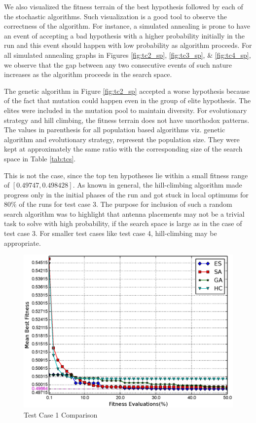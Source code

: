 \documentclass[conference]{IEEEtran}
\begin{document}
We also visualized the fitness terrain of the best hypothesis followed by each of the stochastic algorithms. Such visualization is a good tool to observe the correctness of the algorithm. For instance, a simulated annealing is prone to have an event of accepting a bad hypothesis with a higher probability initially in the run and this event should happen with low probability as algorithm proceeds. For all simulated annealing graphs in Figures \ref{fig:tc2_sp}, \ref{fig:tc3_sp}, \& \ref{fig:tc4_sp}, we observe that the gap between any two consecutive events of such nature increases as the algorithm proceeds in the search space. 

The genetic algorithm in Figure \ref{fig:tc2_sp} accepted a worse hypothesis because of the fact that mutation could happen even in the group of elite hypothesis. The elites were included in the mutation pool to maintain diversity. For evolutionary strategy and hill climbing, the fitness terrain does not have unorthodox patterns. The values in parenthesis for all population based algorithms viz. genetic algorithm and evolutionary strategy, represent the population size. They were kept at approximately the same ratio with the corresponding size of the search space in Table \ref{tab:tcs}.

This is not the case, since the top ten hypotheses lie within a small fitness range of $[0.49747, 0.498428]$. As known in general, the hill-climbing algorithm made progress only in the initial phases of the run and got stuck in local optimums for $80\%$ of the runs for test case 3. The purpose for inclusion of such a random search algorithm was to highlight that antenna placements may not be a trivial task to solve with high probability, if the search space is large as in the case of test case $3$. For smaller test cases like test case 4, hill-climbing may be appropriate.

\begin{figure}
    \begin{center}
        \includegraphics[width=.41\textwidth]{FIG/tc1_mf.eps}
\end{center}
\caption{Test Case 1 Comparison}
\label{fig:tc1_sp}
\end{figure}
\end{document}
